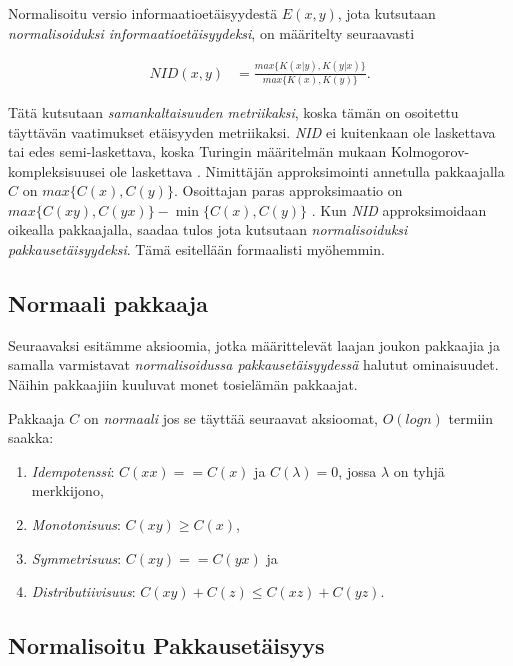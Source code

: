 \documentclass[12pt,finnish,draft,twoside]{tktltiki2}
\theoremstyle{definition}
\theoremstyle{remark}
\newcommand{\kolmogorov}{Kolmogorov-kompleksisuus}
\begin{document}
  Normalisoitu versio informaatioetäisyydestä $E(x,y)$, jota kutsutaan \emph{normalisoiduksi informaatioetäisyydeksi}, on määritelty seuraavasti

  \begin{align}
    NID(x,y) &= \frac{ max\{K{(x|y)},K{(y|x)}\} }{ max \{K(x),K(y)\}}.
  \end{align}

  Tätä kutsutaan \emph{samankaltaisuuden metriikaksi}, koska tämän on osoitettu \cite{CV05} täyttävän vaatimukset etäisyyden metriikaksi. \emph{NID} ei kuitenkaan ole laskettava tai edes semi-laskettava, koska Turingin määritelmän mukaan \kolmogorov ei ole laskettava \cite{CV05}.
  Nimittäjän approksimointi annetulla pakkaajalla $C$ on $max \{C(x),C(y)\}$. Osoittajan paras approksimaatio on $max\{C(xy),C(yx)\} - \min\{C(x),C(y)\}$ \cite{CV05}.
  Kun \emph{NID} approksimoidaan oikealla pakkaajalla, saadaa tulos jota kutsutaan \emph{normalisoiduksi pakkausetäisyydeksi}. Tämä esitellään formaalisti myöhemmin.

\subsection{Normaali pakkaaja} %
\label{sub:normaali_pakkaaja}

  Seuraavaksi esitämme aksioomia, jotka määrittelevät laajan joukon pakkaajia ja samalla varmistavat \emph{normalisoidussa pakkausetäisyydessä} halutut ominaisuudet. Näihin pakkaajiin kuuluvat monet tosielämän pakkaajat.

  Pakkaaja $C$ on \emph{normaali} jos se täyttää seuraavat aksioomat, $O(log n)$ termiin saakka:

  \begin{enumerate}
    \item \emph{Idempotenssi}: $C(xx) == C(x)$ ja $C(\lambda) = 0$, jossa $\lambda$ on tyhjä merkkijono,
    \item \emph{Monotonisuus}: $C(xy) \geq C(x)$,
    \item \emph{Symmetrisuus}: $C(xy) == C(yx)$ ja
    \item \emph{Distributiivisuus}: $C(xy) + C(z) \leq C(xz) + C(yz)$.
  \end{enumerate}

\subsection{Normalisoitu Pakkausetäisyys} %
\label{sub:normalisoitu_pakkauset_isyys}
\end{document}

